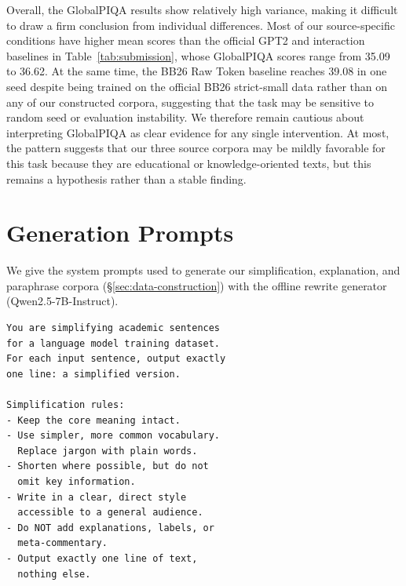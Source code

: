 \documentclass[11pt]{article}
\begin{document}
Overall, the GlobalPIQA results show relatively high variance, making it difficult to draw a firm conclusion from individual differences. Most of our source-specific conditions have higher mean scores than the official GPT2 and interaction baselines in Table~\ref{tab:submission}, whose GlobalPIQA scores range from 35.09 to 36.62. At the same time, the BB26 Raw Token baseline reaches 39.08 in one seed despite being trained on the official BB26 strict-small data rather than on any of our constructed corpora, suggesting that the task may be sensitive to random seed or evaluation instability. We therefore remain cautious about interpreting GlobalPIQA as clear evidence for any single intervention. At most, the pattern suggests that our three source corpora may be mildly favorable for this task because they are educational or knowledge-oriented texts, but this remains a hypothesis rather than a stable finding.

\section{Generation Prompts}
\label{app:prompts}

We give the system prompts used to generate our simplification, explanation, and paraphrase corpora (\S\ref{sec:data-construction}) with the offline rewrite generator (Qwen2.5-7B-Instruct).

\begin{center}
\scriptsize
\renewcommand{\baselinestretch}{0.78}\selectfont
\begin{verbatim}
You are simplifying academic sentences
for a language model training dataset.
For each input sentence, output exactly
one line: a simplified version.

Simplification rules:
- Keep the core meaning intact.
- Use simpler, more common vocabulary.
  Replace jargon with plain words.
- Shorten where possible, but do not
  omit key information.
- Write in a clear, direct style
  accessible to a general audience.
- Do NOT add explanations, labels, or
  meta-commentary.
- Output exactly one line of text,
  nothing else.
\end{verbatim}
\label{fig:simp-prompt}
\end{center}
\end{document}
